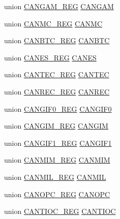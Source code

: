 \begin{DoxyCompactItemize}
\item 
union \hyperlink{union_c_a_n_g_a_m___r_e_g}{C\+A\+N\+G\+A\+M\+\_\+\+R\+E\+G} \hyperlink{struct_e_c_a_n___r_e_g_s_ab41894af9dacded39b406449a5697306}{C\+A\+N\+G\+A\+M}
\item 
union \hyperlink{union_c_a_n_m_c___r_e_g}{C\+A\+N\+M\+C\+\_\+\+R\+E\+G} \hyperlink{struct_e_c_a_n___r_e_g_s_afbf8f351750af9f085ad32d5b86db74d}{C\+A\+N\+M\+C}
\item 
union \hyperlink{union_c_a_n_b_t_c___r_e_g}{C\+A\+N\+B\+T\+C\+\_\+\+R\+E\+G} \hyperlink{struct_e_c_a_n___r_e_g_s_a17f4e563f1eb0289e0b24812cb03ace3}{C\+A\+N\+B\+T\+C}
\item 
union \hyperlink{union_c_a_n_e_s___r_e_g}{C\+A\+N\+E\+S\+\_\+\+R\+E\+G} \hyperlink{struct_e_c_a_n___r_e_g_s_ab92410d86dc259fee5047faf951c0177}{C\+A\+N\+E\+S}
\item 
union \hyperlink{union_c_a_n_t_e_c___r_e_g}{C\+A\+N\+T\+E\+C\+\_\+\+R\+E\+G} \hyperlink{struct_e_c_a_n___r_e_g_s_ab0f0c0bb3ab86143ae06b15b4bd53d0d}{C\+A\+N\+T\+E\+C}
\item 
union \hyperlink{union_c_a_n_r_e_c___r_e_g}{C\+A\+N\+R\+E\+C\+\_\+\+R\+E\+G} \hyperlink{struct_e_c_a_n___r_e_g_s_a2fc19130783c269e33aae4b1d145c80b}{C\+A\+N\+R\+E\+C}
\item 
union \hyperlink{union_c_a_n_g_i_f0___r_e_g}{C\+A\+N\+G\+I\+F0\+\_\+\+R\+E\+G} \hyperlink{struct_e_c_a_n___r_e_g_s_adb280b32340ff26352e02bb177e9a4c9}{C\+A\+N\+G\+I\+F0}
\item 
union \hyperlink{union_c_a_n_g_i_m___r_e_g}{C\+A\+N\+G\+I\+M\+\_\+\+R\+E\+G} \hyperlink{struct_e_c_a_n___r_e_g_s_aa4282c2b50410ad07d92a06389804c4c}{C\+A\+N\+G\+I\+M}
\item 
union \hyperlink{union_c_a_n_g_i_f1___r_e_g}{C\+A\+N\+G\+I\+F1\+\_\+\+R\+E\+G} \hyperlink{struct_e_c_a_n___r_e_g_s_aee5d208c7c1c2be9e6094ada4064b5b4}{C\+A\+N\+G\+I\+F1}
\item 
union \hyperlink{union_c_a_n_m_i_m___r_e_g}{C\+A\+N\+M\+I\+M\+\_\+\+R\+E\+G} \hyperlink{struct_e_c_a_n___r_e_g_s_aac5ad0f5483d4b8a86e4d2f76cd299ad}{C\+A\+N\+M\+I\+M}
\item 
union \hyperlink{union_c_a_n_m_i_l___r_e_g}{C\+A\+N\+M\+I\+L\+\_\+\+R\+E\+G} \hyperlink{struct_e_c_a_n___r_e_g_s_a88c92abb80ef652a5223353887e881f0}{C\+A\+N\+M\+I\+L}
\item 
union \hyperlink{union_c_a_n_o_p_c___r_e_g}{C\+A\+N\+O\+P\+C\+\_\+\+R\+E\+G} \hyperlink{struct_e_c_a_n___r_e_g_s_a0da745f0b71eb93312dfbfbcc0766b0a}{C\+A\+N\+O\+P\+C}
\item 
union \hyperlink{union_c_a_n_t_i_o_c___r_e_g}{C\+A\+N\+T\+I\+O\+C\+\_\+\+R\+E\+G} \hyperlink{struct_e_c_a_n___r_e_g_s_a6c4003e7639d4b972361b958d475c92a}{C\+A\+N\+T\+I\+O\+C}

\end{DoxyCompactItemize}
